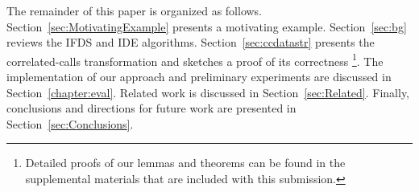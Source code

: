 The remainder of this paper is organized as follows.
%
Section~\ref{sec:MotivatingExample} presents a motivating example.
%
Section~\ref{sec:bg} reviews the IFDS and IDE algorithms.
%
Section~\ref{sec:ccdatastr} presents the correlated-calls transformation
and sketches a proof of its correctness%
\footnote{
  Detailed proofs of our lemmas and theorems can be found in
  the supplemental materials that are included with this submission.
}.
%
The implementation of our approach and preliminary experiments are discussed
in Section~\ref{chapter:eval}.
%
Related work is discussed in Section~\ref{sec:Related}.
%
Finally, conclusions and directions for future work are presented in Section~\ref{sec:Conclusions}.

 
 
